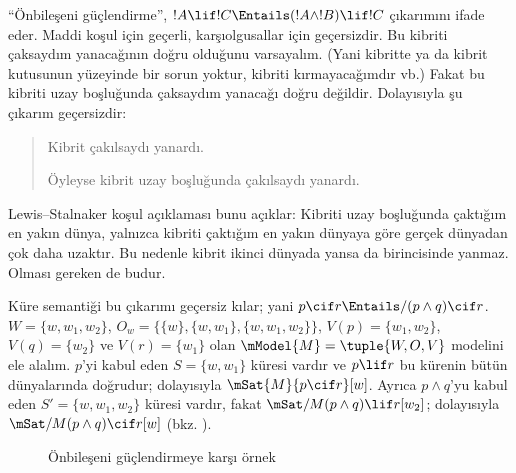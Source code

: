 \documentclass[../../../include/open-logic-section]{subfiles}
\begin{document}


``Önbileşeni güçlendirme'', $!A\lif !C\Entails(!A\land !B)\lif !C$
çıkarımını ifade eder. Maddi koşul için geçerli, karşıolgusallar için
geçersizdir. Bu kibriti çaksaydım yanacağının doğru olduğunu varsayalım.
(Yani kibritte ya da kibrit kutusunun yüzeyinde bir sorun yoktur, kibriti
kırmayacağımdır vb.) Fakat bu kibriti uzay boşluğunda çaksaydım yanacağı
doğru değildir. Dolayısıyla şu çıkarım geçersizdir:
\begin{quote}
  Kibrit çakılsaydı yanardı.

  Öyleyse kibrit uzay boşluğunda çakılsaydı yanardı.
\end{quote}

Lewis--Stalnaker koşul açıklaması bunu açıklar: Kibriti uzay boşluğunda
çaktığım en yakın dünya, yalnızca kibriti çaktığım en yakın dünyaya göre
gerçek dünyadan çok daha uzaktır. Bu nedenle kibrit ikinci dünyada yansa da
birincisinde yanmaz. Olması gereken de budur.

\begin{ex}
  Küre semantiği bu çıkarımı geçersiz kılar; yani
  $p\cif r\Entails/(p\land q)\cif r$. $W=\{w,w_1,w_2\}$,
  $O_w=\{\{w\},\{w,w_1\},\{w,w_1,w_2\}\}$,
  $V(p)=\{w_1,w_2\}$, $V(q)=\{w_2\}$ ve $V(r)=\{w_1\}$ olan
  $\mModel{M}=\tuple{W,O,V}$ modelini ele alalım. $p$'yi kabul eden
  $S=\{w,w_1\}$ küresi vardır ve $p\lif r$ bu kürenin bütün dünyalarında
  doğrudur; dolayısıyla $\mSat{M}{p\cif r}[w]$. Ayrıca $p\land q$'yu kabul
  eden $S'=\{w,w_1,w_2\}$ küresi vardır, fakat
  $\mSat/{M}{(p\land q)\lif r}[w_2]$; dolayısıyla
  $\mSat/{M}{(p\land q)\cif r}[w]$
  (bkz. ).

\begin{figure}
\begin{center}
\caption{Önbileşeni güçlendirmeye karşı örnek}
\end{center}
\end{figure}
\end{ex}
\end{document}
